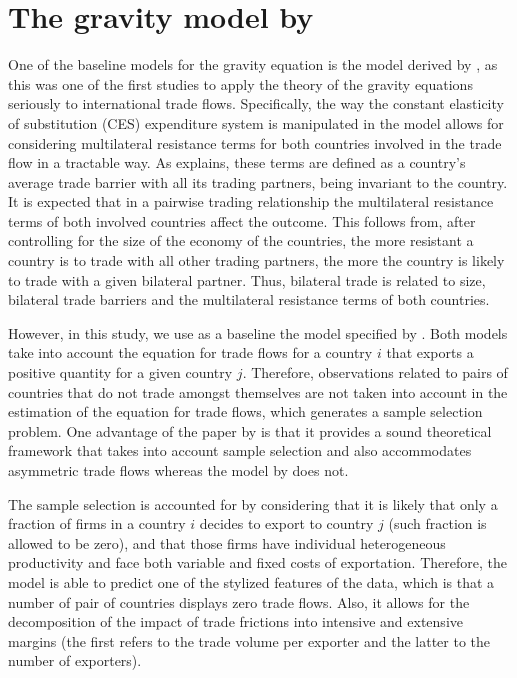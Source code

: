 \section{The gravity model by \cite{helpman2008estimating}} \label{gravity_model}
One of the baseline models for the gravity equation is the model derived by \cite{anderson2003gravity}, as this was one of the first studies to apply the theory of the gravity equations seriously to international trade flows. Specifically, the way the constant elasticity of substitution (CES) expenditure system is manipulated in the model allows for considering multilateral resistance terms for both countries involved in the trade flow in a tractable way. As \cite{anderson2003gravity} explains, these terms are defined as a country's average trade barrier with all its trading partners, being invariant to the country. It is expected that in a pairwise trading relationship the multilateral resistance terms of both involved countries affect the outcome. This follows from, after controlling for the size of the economy of the countries, the more resistant a country is to trade with all other trading partners, the more the country is likely to trade with a given bilateral partner. Thus, bilateral trade is related to size, bilateral trade barriers and the multilateral resistance terms of both countries. 

However, in this study, we use as a baseline the model specified by \cite{helpman2008estimating}. Both models take into account the equation for trade flows for a country $i$ that exports a positive quantity for a given country $j$. Therefore, observations related to pairs of countries that do not trade amongst themselves are not taken into account in the estimation of the equation for trade flows, which generates a sample selection problem. One advantage of the paper by \cite{helpman2008estimating} is that it provides a sound theoretical framework that takes into account sample selection and also accommodates asymmetric trade flows whereas the model by \cite{anderson2003gravity} does not. 

The sample selection is accounted for by considering that it is likely that only a fraction of firms in a country $i$ decides to export to country $j$ (such fraction is allowed to be zero), and that those firms have individual heterogeneous productivity and face both variable and fixed costs of exportation. Therefore, the model is able to predict one of the stylized features of the data, which is that a number of pair of countries displays zero trade flows. Also, it allows for the decomposition of the impact of trade frictions into intensive and extensive margins (the first refers to the trade volume per exporter and the latter to the number of exporters).

